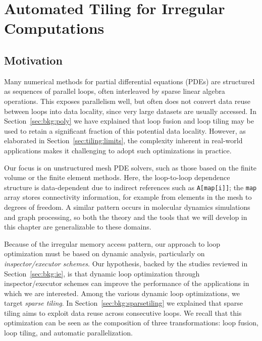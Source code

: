 \chapter{Automated Tiling for Irregular Computations}
\label{ch:sparsetiling}

\section{Motivation}
\label{sec:tiling:motivation}





Many numerical methods for partial differential equations (PDEs) are structured as sequences of parallel loops, often interleaved by sparse linear algebra operations. This exposes parallelism well, but often does not convert data reuse between loops into data locality, since very large datasets are usually accessed. In Section~\ref{sec:bkg:poly} we have explained that loop fusion and loop tiling may be used to retain a significant fraction of this potential data locality. However, as elaborated in Section~\ref{sec:tiling:limits}, the complexity inherent in real-world applications makes it challenging to adopt such optimizations in practice. 

Our focus is on unstructured mesh PDE solvers, such as those based on the finite volume or the finite element methods. Here, the  loop-to-loop dependence structure is data-dependent due to
indirect references such as \texttt{A[map[i]]}; the \texttt{map} array stores connectivity information, for example from elements in the mesh to degrees of freedom. A similar pattern occurs in molecular dynamics simulations and graph processing, so both the theory and the tools that we will develop in this chapter are generalizable to these domains. 

Because of the irregular memory access pattern, our approach to loop optimization must be based on dynamic analysis, particularly on \textit{inspector/executor schemes}. Our hypothesis, backed by the studies reviewed in Section~\ref{sec:bkg:ie}, is that dynamic loop optimization through inspector/executor schemes can improve the performance of the applications in which we are interested. Among the various dynamic loop optimizations, we target \textit{sparse tiling}. In Section~\ref{sec:bkg:sparsetiling} we explained that sparse tiling aims to exploit data reuse across consecutive loops. We recall that this optimization can be seen as the composition of three transformations: loop fusion, loop tiling, and automatic parallelization. 

